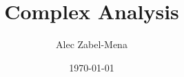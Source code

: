 \documentclass[12pt, twoside]{book}
\title{Complex Analysis}
\author{Alec Zabel-Mena}
\date{\today}
\begin{document}
\maketitle
\tableofcontents
\newpage







\nocite{*}



\end{document}
